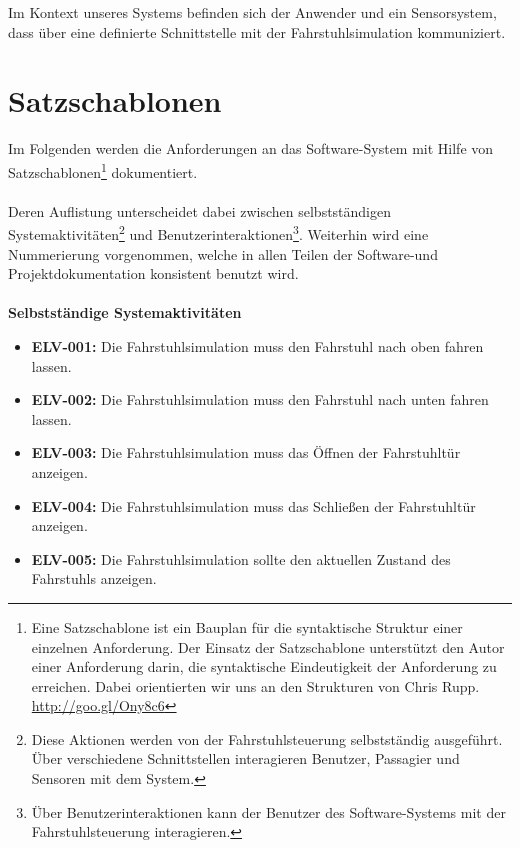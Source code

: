 \vspace{0,5cm}

Im Kontext unseres Systems befinden sich der Anwender und ein Sensorsystem, dass über eine definierte Schnittstelle mit der \gls{Fahrstuhlsimulation} kommuniziert.

\newpage
\section{Satzschablonen}
Im Folgenden werden die Anforderungen an das Software-System mit Hilfe von Satzschablonen\footnote{Eine Satzschablone ist ein Bauplan für die syntaktische Struktur einer einzelnen Anforderung. Der Einsatz der Satzschablone unterstützt den Autor einer Anforderung darin, die syntaktische Eindeutigkeit der Anforderung zu erreichen. Dabei orientierten wir uns an den Strukturen von Chris Rupp. \url{http://goo.gl/Ony8c6}} dokumentiert. 

\paragraph{}
Deren Auflistung unterscheidet dabei zwischen selbstständigen Systemaktivitäten\footnote{Diese Aktionen werden von der \gls{Fahrstuhlsteuerung} selbstständig ausgeführt. Über verschiedene Schnittstellen interagieren Benutzer, Passagier und Sensoren mit dem System.} und Benutzerinteraktionen\footnote{Über Benutzerinteraktionen kann der Benutzer des Software-Systems mit der \gls{Fahrstuhlsteuerung} interagieren.}. Weiterhin wird eine Nummerierung vorgenommen, welche in allen Teilen der Software-und Projektdokumentation konsistent benutzt wird.

\paragraph{}
\textbf{Selbstständige Systemaktivitäten}
\begin{itemize}
	\item \textbf{ELV-001:} \newline
		Die \gls{Fahrstuhlsimulation} muss den Fahrstuhl nach oben fahren lassen.
	\item \textbf{ELV-002:} \newline
		Die \gls{Fahrstuhlsimulation} muss den Fahrstuhl nach unten fahren lassen.
	\item \textbf{ELV-003:} \newline
		Die \gls{Fahrstuhlsimulation} muss das Öffnen der Fahrstuhltür anzeigen.
	\item \textbf{ELV-004:} \newline
		Die \gls{Fahrstuhlsimulation} muss das Schließen der Fahrstuhltür anzeigen.
	\item \textbf{ELV-005:} \newline
		Die \gls{Fahrstuhlsimulation} sollte den aktuellen Zustand des Fahrstuhls anzeigen.
\end{itemize}

